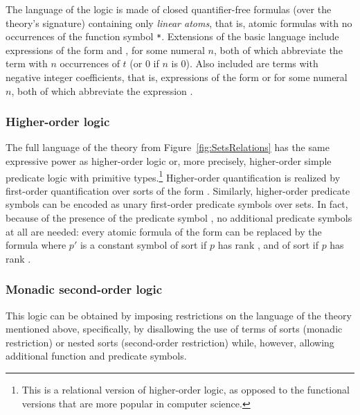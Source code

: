 The language of the logic is made of
closed quantifier-free formulas (over the theory's signature)
containing only \emph{linear atoms}, that is, 
atomic formulas with no occurrences of the function symbol \verb|*|.
Extensions of the basic language include 
expressions of the form  and , 
for some numeral $n$, 
both of which abbreviate the term  
with $n$ occurrences of $t$ (or 0 if $n$ is 0).
Also included are terms with negative integer coefficients, that is,
expressions of the form  or  
for some numeral $n$,
both of which abbreviate the expression .


\subsubsection*{Higher-order logic}
%
The full language of the theory  
from Figure~\ref{fig:SetsRelations} has the same expressive power as
higher-order logic or, more precisely, higher-order simple predicate logic
with primitive types.\footnote{%
This is a relational version of higher-order logic, as opposed 
to the functional versions that are more popular in computer science. 
}
Higher-order quantification is realized by first-order quantification 
over sorts of the form .
Similarly, higher-order predicate symbols can be encoded 
as unary first-order predicate symbols over sets.
In fact, because of the presence of the predicate symbol , 
no additional predicate symbols at all are needed:
every atomic formula of the form  
can be replaced by the formula 
where $p'$ is a constant symbol of sort 
if $p$ has rank , 
and of sort 
if $p$ has rank .

\subsubsection*{Monadic second-order logic}
This logic can be obtained by imposing restrictions on the language
of the  theory mentioned above, specifically, 
by disallowing the use of terms of  sorts (monadic restriction) or
nested  sorts (second-order restriction) 
while, however, allowing additional function and predicate symbols.



